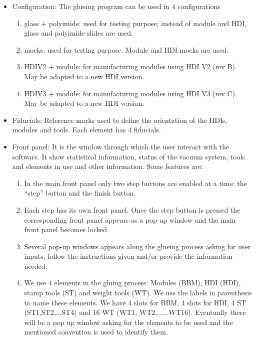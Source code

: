 \documentclass[12pt]{unlsilabsop}
\begin{document}
\begin{itemize}
\item Configuration: The glueing program can be used in 4 configurations
  \begin{enumerate}
  \item glass + polyimide: used for testing purpose; instead of module and HDI, glass and polyimide slides are used.
  \item mocks: used for testing purpose. Module and HDI mocks are used.
  \item HDIV2 + module: for manufacturing modules using HDI V2 (rev B). May be adapted to a new HDI version.
  \item HDIV3 + module: for manufacturing modules using HDI V3 (rev C). May be adapted to a new HDI version.
  \end{enumerate}
\item Fiducials: Reference marks used to define the orientation of the HDIs, modules and tools. Each element has 4 fiducials. 
\item Front panel: It is the window through which the user interact with the software. It show statistical information, status of the vacuum system, tools and elements in use and other information. Some features are:
  \begin{enumerate}
    \item In the main front panel only two step buttons are enabled at a time: the ``step'' button and the finish button. 
    \item Each step has its own front panel. Once the step button is pressed the corresponding front panel appears as a pop-up window and the main front panel becomes locked.
    \item Several pop-up windows appears along the glueing process asking for user inputs, follow the instructions given and/or provide the information needed.
    \item We use 4 elements in the gluing process: Modules (BBM), HDI (HDI), stamp tools (ST) and weight tools (WT). We use the labels in parenthesis to name these elements. We have 4 slots for BBM, 4 slots for HDI, 4 ST (ST1,ST2,...ST4) and 16 WT (WT1, WT2,......WT16). Eventually there will be a pop up window asking for the elements to be used and the mentioned convention is used to identify them.    
  \end{enumerate}
\end{itemize}



\end{document}
